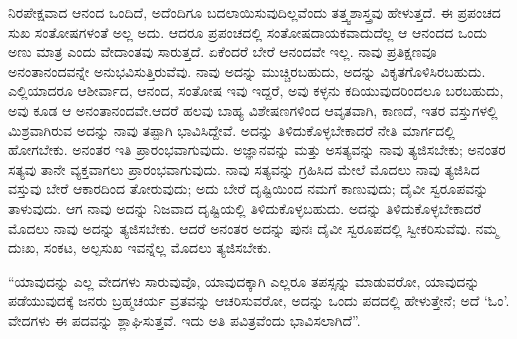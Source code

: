 ನಿರಪೇಕ್ಷವಾದ ಆನಂದ ಒಂದಿದೆ, ಅದೆಂದಿಗೂ ಬದಲಾಯಿಸುವುದಿಲ್ಲವೆಂದು ತತ್ತ್ವಶಾಸ್ತ್ರವು ಹೇಳುತ್ತದೆ. ಈ ಪ್ರಪಂಚದ ಸುಖ ಸಂತೋಷಗಳಂತೆ ಅಲ್ಲ ಅದು. ಆದರೂ ಪ್ರಪಂಚದಲ್ಲಿ ಸಂತೋಷದಾಯಕವಾದುದೆಲ್ಲ ಆ ಆನಂದದ ಒಂದು ಅಣು ಮಾತ್ರ ಎಂದು ವೇದಾಂತವು ಸಾರುತ್ತದೆ. ಏಕೆಂದರೆ ಬೇರೆ ಆನಂದವೇ ಇಲ್ಲ. ನಾವು ಪ್ರತಿಕ್ಷಣವೂ ಅನಂತಾನಂದವನ್ನೇ ಅನುಭವಿಸುತ್ತಿರುವೆವು. ನಾವು ಅದನ್ನು ಮುಚ್ಚಿರಬಹುದು, ಅದನ್ನು ವಿಕೃತಗೊಳಿಸಿರಬಹುದು. ಎಲ್ಲಿಯಾದರೂ ಆಶೀರ್ವಾದ, ಆನಂದ, ಸಂತೋಷ ಇವು ಇದ್ದರೆ, ಅವು ಕಳ್ಳನು ಕದಿಯುವುದರಿಂದಲೂ ಬರಬಹುದು, ಅವು ಕೂಡ ಆ ಅನಂತಾನಂದವೇ.ಆದರೆ ಹಲವು ಬಾಹ್ಯ ವಿಶೇಷಣಗಳಿಂದ ಆವೃತವಾಗಿ, ಕಾಣದೆ, ಇತರ ವಸ್ತುಗಳಲ್ಲಿ ಮಿಶ್ರವಾಗಿರುವ ಅದನ್ನು ನಾವು ತಪ್ಪಾಗಿ ಭಾವಿಸಿದ್ದೇವೆ. ಅದನ್ನು ತಿಳಿದುಕೊಳ್ಳಬೇಕಾದರೆ ನೇತಿ ಮಾರ್ಗದಲ್ಲಿ ಹೋಗಬೇಕು. ಅನಂತರ ಇತಿ ಪ್ರಾರಂಭವಾಗುವುದು. ಅಜ್ಞಾನವನ್ನು ಮತ್ತು ಅಸತ್ಯವನ್ನು ನಾವು ತ್ಯಜಿಸಬೇಕು; ಅನಂತರ ಸತ್ಯವು ತಾನೇ ವ್ಯಕ್ತವಾಗಲು ಪ್ರಾರಂಭವಾಗುವುದು. ನಾವು ಸತ್ಯವನ್ನು ಗ್ರಹಿಸಿದ ಮೇಲೆ ಮೊದಲು ನಾವು ತ್ಯಜಿಸಿದ ವಸ್ತುವು ಬೇರೆ ಆಕಾರದಿಂದ ತೋರುವುದು; ಅದು ಬೇರೆ ದೃಷ್ಟಿಯಿಂದ ನಮಗೆ ಕಾಣುವುದು; ದೈವೀ ಸ್ವರೂಪವನ್ನು ತಾಳುವುದು. ಆಗ ನಾವು ಅದನ್ನು ನಿಜವಾದ ದೃಷ್ಟಿಯಲ್ಲಿ ತಿಳಿದುಕೊಳ್ಳಬಹುದು. ಅದನ್ನು ತಿಳಿದುಕೊಳ್ಳಬೇಕಾದರೆ ಮೊದಲು ನಾವು ಅದನ್ನು ತ್ಯಜಿಸಬೇಕು. ಆದರೆ ಅನಂತರ ಅದನ್ನು ಪುನಃ ದೈವೀ ಸ್ವರೂಪದಲ್ಲಿ ಸ್ವೀಕರಿಸುವೆವು. ನಮ್ಮ ದುಃಖ, ಸಂಕಟ, ಅಲ್ಪಸುಖ ಇವನ್ನೆಲ್ಲ ಮೊದಲು ತ್ಯಜಿಸಬೇಕು.

“ಯಾವುದನ್ನು ಎಲ್ಲ ವೇದಗಳು ಸಾರುವುವೊ, ಯಾವುದಕ್ಕಾಗಿ ಎಲ್ಲರೂ ತಪಸ್ಸನ್ನು ಮಾಡುವರೋ, ಯಾವುದನ್ನು ಪಡೆಯುವುದಕ್ಕೆ ಜನರು ಬ್ರಹ್ಮಚರ್ಯ ವ್ರತವನ್ನು ಆಚರಿಸುವರೋ, ಅದನ್ನು ಒಂದು ಪದದಲ್ಲಿ ಹೇಳುತ್ತೇನೆ; ಅದೆ ‘ಓಂ’. ವೇದಗಳು ಈ ಪದವನ್ನು ಶ್ಲಾಘಿಸುತ್ತವೆ. ಇದು ಅತಿ ಪವಿತ್ರವೆಂದು ಭಾವಿಸಲಾಗಿದೆ”.

